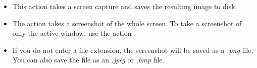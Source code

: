 
\begin{itemize}
\item This action takes a screen capture and saves the resulting image to disk.
\item The action takes a screenshot of the whole screen. To take a screenshot of only the active window, use the action . 
\item If you do not enter a file extension, the screenshot will be saved as a \emph{.png} file. You can also save the file as an \emph{.jpeg} or \emph{.bmp} file.

\end{itemize}
